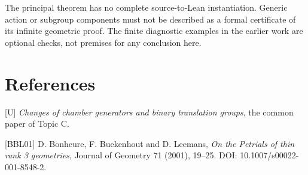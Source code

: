 The principal theorem has no complete source-to-Lean instantiation.
Generic action or subgroup components must not be described as a
formal certificate of its infinite geometric proof. The finite
diagnostic examples in the earlier work are optional checks, not
premises for any conclusion here.

\section*{References}
{[}U{]} \emph{Changes of chamber generators and binary translation
groups}, the common paper of Topic C.

{[}BBL01{]} D. Bonheure, F. Buekenhout and D. Leemans,
\emph{On the Petrials of thin rank 3 geometries}, Journal of Geometry
71 (2001), 19--25. DOI: 10.1007/s00022-001-8548-2.

